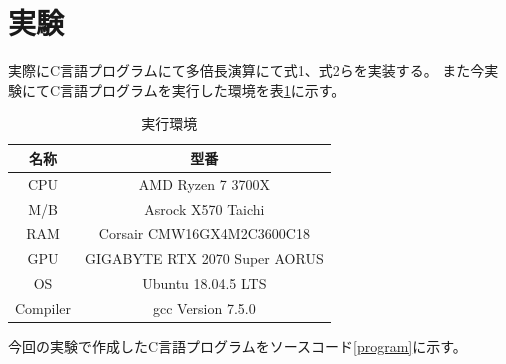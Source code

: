 \documentclass[a4j,dvipdfmx,titlepage]{jarticle}
\begin{document}
\section{実験}
実際にC言語プログラムにて多倍長演算にて式1、式2らを実装する。
また今実験にてC言語プログラムを実行した環境を表\ref{a}に示す。
\begin{table}[H]
    \begin{center}
      \caption{実行環境}
      \begin{tabular}{c|c} 
       名称 & 型番 \\ \hline 
        CPU & AMD Ryzen 7 3700X\\
         M/B & Asrock X570 Taichi \\
         RAM &  Corsair CMW16GX4M2C3600C18\\
         GPU & GIGABYTE RTX 2070 Super AORUS\\
        OS & Ubuntu 18.04.5 LTS\\ 
        Compiler & gcc Version 7.5.0\\ 
      \end{tabular}
      \label{a}
\end{center}
\end{table}
今回の実験で作成したC言語プログラムをソースコード\ref{program}に示す。
\end{document}

